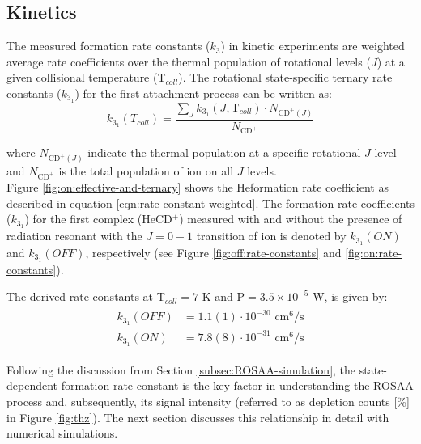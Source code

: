 \subsection{Kinetics}
\label{subsec:CD+-kinetics}

The measured formation rate constants ($k_3$) in kinetic experiments are 
weighted average rate coefficients over the thermal population of rotational
levels ($J$) at a given collisional temperature (T$_{coll}$). The rotational
state-specific ternary rate constants ($k_{3_1}$) for the first attachment process can be written as:
\begin{equation}
    k_{3_1} (T_{coll}) = \frac{\sum_{J} k_{3_1} (J, \text{T}_{coll}) \cdot N_{\text{CD}^+ (J)} }{N_{\text{CD}^+}}
    \label{eqn:rate-constant-weighted}
\end{equation}

where $N_{\text{CD}^+ (J)}$ indicate the thermal population at a specific rotational $J$ level 
and $N_{\text{CD}^+}$ is the total population of \CD ion on all $J$ levels.\\


Figure \ref{fig:on:effective-and-ternary} shows the He\CD formation rate
coefficient as described in equation \ref{eqn:rate-constant-weighted}. The
formation rate coefficients ($k_{3_1}$) for the first complex (HeCD$^+$) measured with and without the presence of radiation resonant with the $J=0-1$ transition of \CD ion is denoted by $k_{3_1}(ON)$ and
$k_{3_1}(OFF)$, respectively (see Figure \ref{fig:off:rate-constants} and \ref{fig:on:rate-constants}).

The derived rate constants at T$_{coll}=7$ K and P$=3.5\times 10^{-5}$ W, is given by:
\begin{align}
    \label{eqn:k-on-off}
    \begin{split}
        k_{3_1}(OFF) &= 1.1(1) \cdot 10^{-30} \text{ cm}^6/\text{s}\\
        k_{3_1}(ON) &= 7.8(8) \cdot 10^{-31} \text{ cm}^6/\text{s}
    \end{split}
\end{align}

Following the discussion from Section \ref{subsec:ROSAA-simulation}, the
state-dependent formation rate constant is the key factor in understanding the
ROSAA process and, subsequently, its signal intensity (referred to as depletion
counts [\%] in Figure \ref{fig:thz}). The next section discusses this
relationship in detail with numerical simulations.


